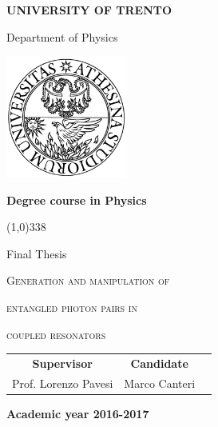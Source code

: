 \begin{titlepage}
  \pagestyle{empty}

  \begin{center}
    {\bfseries
      \Large {\huge U}NIVERSITY OF {\huge T}RENTO}

    \vspace{0.2cm}

    {\Large Department of Physics}

    \vspace{0.5cm}

    \begin{center}
      \includegraphics[width=0.3\textwidth]{img/logo_unitn.png}
    \end{center}

    \vspace{0.5cm}

    {\bfseries \Large Degree course in Physics}

    \vspace{0.3cm}
    \line(1,0){338}
    \vspace{0.3cm}

    {\Large Final Thesis}

    \vspace{2.5cm}

    {\huge \textsc{Generation and manipulation of}}

    \vspace{0.4cm}

    {\huge \textsc{entangled photon pairs in}}

     \vspace{0.4cm}

     {\huge \textsc{coupled resonators}}
    

    \vspace{3.0cm}


    \large
    \begin{center}
      \begin{tabular}{ccc}
        {\bfseries Supervisor} &
        \hspace{5cm}
        {\bfseries Candidate} \\

        Prof. Lorenzo Pavesi &
        \hspace{5cm} Marco Canteri \\


      \end{tabular}
    \end{center}
    \vspace{2cm}

    {\bfseries \large Academic year 2016-2017}
    \vfill
  \end{center}
\end{titlepage}
